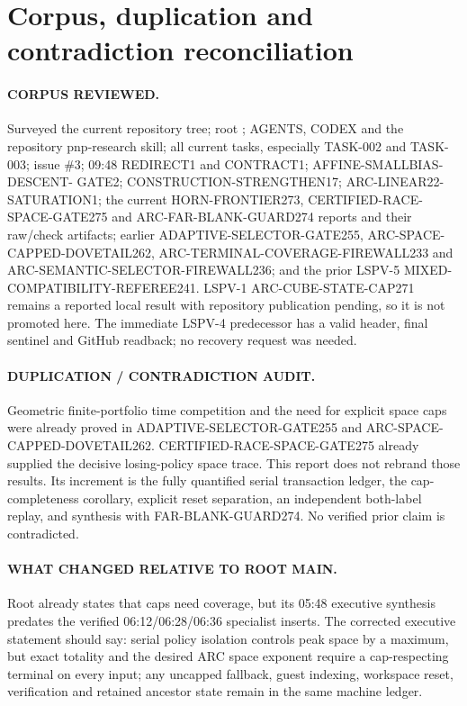 \documentclass[11pt]{article}
\begin{document}
\section{Corpus, duplication and contradiction reconciliation}
\paragraph{CORPUS REVIEWED.}
Surveyed the current repository tree; root ; AGENTS, CODEX and
the repository pnp-research skill; all current tasks, especially TASK-002 and
TASK-003; issue \#3; 09:48 REDIRECT1 and CONTRACT1; AFFINE-SMALLBIAS-DESCENT-
GATE2; CONSTRUCTION-STRENGTHEN17; ARC-LINEAR22-SATURATION1; the current
HORN-FRONTIER273, CERTIFIED-RACE-SPACE-GATE275 and ARC-FAR-BLANK-GUARD274
reports and their raw/check artifacts; earlier ADAPTIVE-SELECTOR-GATE255,
ARC-SPACE-CAPPED-DOVETAIL262, ARC-TERMINAL-COVERAGE-FIREWALL233 and
ARC-SEMANTIC-SELECTOR-FIREWALL236; and the prior LSPV-5
MIXED-COMPATIBILITY-REFEREE241.  LSPV-1 ARC-CUBE-STATE-CAP271 remains a
reported local result with repository publication pending, so it is not
promoted here.  The immediate LSPV-4 predecessor has a valid header, final
sentinel and GitHub readback; no recovery request was needed.

\paragraph{DUPLICATION / CONTRADICTION AUDIT.}
Geometric finite-portfolio time competition and the need for explicit space
caps were already proved in ADAPTIVE-SELECTOR-GATE255 and
ARC-SPACE-CAPPED-DOVETAIL262.  CERTIFIED-RACE-SPACE-GATE275 already supplied
the decisive losing-policy space trace.  This report does not rebrand those
results.  Its increment is the fully quantified serial transaction ledger,
the cap-completeness corollary, explicit reset separation, an independent
both-label replay, and synthesis with FAR-BLANK-GUARD274.  No verified prior
claim is contradicted.

\paragraph{WHAT CHANGED RELATIVE TO ROOT MAIN.}
Root already states that caps need coverage, but its 05:48 executive synthesis
predates the verified 06:12/06:28/06:36 specialist inserts.  The corrected
executive statement should say: serial policy isolation controls peak space by
a maximum, but exact totality and the desired ARC space exponent require a
cap-respecting terminal on every input; any uncapped fallback, guest indexing,
workspace reset, verification and retained ancestor state remain in the same
machine ledger.
\end{document}

